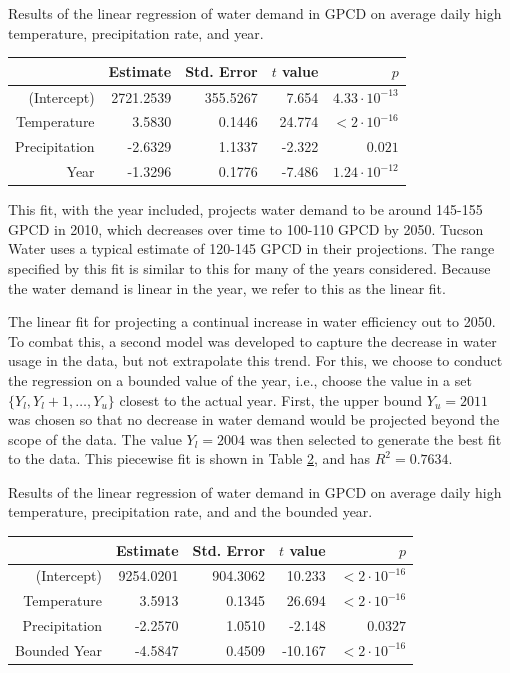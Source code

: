 \documentclass[opre,nonblindrev]{informs3} %
\begin{document}
\begin{table}
	\TABLE
	{
		Results of the linear regression of water demand in GPCD on average daily high temperature, precipitation rate, and year.
		\label{tb:gpcd_linear_reg}
	}
	{\begin{tabular}{rrrrr}
		\hline
						   & Estimate  & Std. Error & $t$ value & $p$ \\
		\hline
		(Intercept)    & 2721.2539 & 355.5267   & 7.654     & $4.33\cdot 10^{-13}$ \\
		Temperature    &   3.5830  & 0.1446     & 24.774    & $< 2\cdot 10^{-16}$\\
		Precipitation  &  -2.6329  & 1.1337     & -2.322    & $0.021$ \\
		Year           &  -1.3296  & 0.1776     & -7.486    & $1.24\cdot 10^{-12}$ \\
		\hline
	\end{tabular}}
	{}
\end{table}

This fit, with the year included, projects water demand to be around 145-155 GPCD in 2010, which decreases over time to 100-110 GPCD by 2050.
Tucson Water uses a typical estimate of 120-145 GPCD in their projections.
The range specified by this fit is similar to this for many of the years considered.
Because the water demand is linear in the year, we refer to this as the linear fit.

The linear fit for projecting a continual increase in water efficiency out to 2050.
To combat this, a second model was developed to capture the decrease in water usage in the data, but not extrapolate this trend.
For this, we choose to conduct the regression on a bounded value of the year, i.e., choose the value in a set $\{Y_l, Y_l+1, \dots, Y_u\}$ closest to the actual year.
First, the upper bound $Y_u = 2011$ was chosen so that no decrease in water demand would be projected beyond the scope of the data.
The value $Y_l = 2004$ was then selected to generate the best fit to the data.
This piecewise fit is shown in Table \ref{tb:gpcd_piecewise_reg}, and has $R^2 = 0.7634$.

\begin{table}
	\TABLE
	{
		Results of the linear regression of water demand in GPCD on average daily high temperature, precipitation rate, and and the bounded year.
		\label{tb:gpcd_piecewise_reg}
	}
	{\begin{tabular}{rrrrr}
		\hline
						   & Estimate  & Std. Error & $t$ value & $p$ \\
		\hline
		(Intercept)    & 9254.0201 & 904.3062   & 10.233    & $<2\cdot 10^{-16}$ \\
		Temperature    & 3.5913    & 0.1345     & 26.694    & $<2\cdot 10^{-16}$ \\
		Precipitation  & -2.2570   & 1.0510     & -2.148    & $0.0327$ \\
		Bounded Year   & -4.5847   & 0.4509     & -10.167   & $<2\cdot 10^{-16}$ \\
		\hline
	\end{tabular}}
	{}
\end{table}
\end{document}
